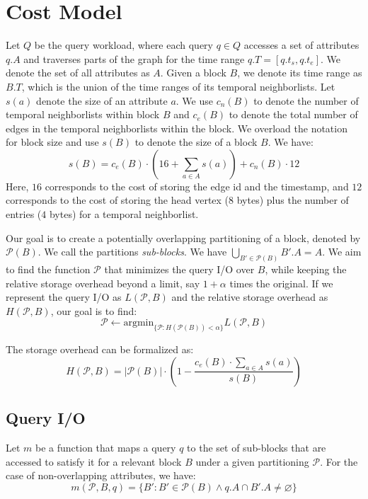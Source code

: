 \documentclass[twocolumn]{svjour3}          %
\let\emptyset\varnothing
\begin{document}
\section{Cost Model}
Let $Q$ be the query workload, where each query $q\in Q$ accesses a set of
attributes $q.A$ and traverses parts of the graph for the time range
$q.T=[q.t_s,q.t_e]$. We denote the set of all attributes as $A$. Given a block
$B$, we denote its time range as $B.T$, which is the union of the time ranges
of its temporal neighborlists. Let $s(a)$ denote the size of an attribute $a$.
We use $c_n(B)$ to denote the number of temporal neighborlists within block
$B$ and $c_e(B)$ to denote the total number of edges in the temporal
neighborlists within the block. We overload the notation for block size and
use $s(B)$ to denote the size of a block $B$. We have: 
\begin{equation}
s(B) = c_e(B) \cdot \left(16 + \sum_{a\in A} s(a)\right) + c_n(B) \cdot 12  
\end{equation}
Here, $16$ corresponds to the cost of storing the edge id and the timestamp,
and $12$ corresponds to the cost of storing the head vertex ($8$ bytes) plus
the number of entries ($4$ bytes) for a temporal neighborlist. 

Our goal is to create a potentially overlapping partitioning of a block,
denoted by $\mathcal{P}(B)$. We call the partitions \emph{sub-blocks}. We have
$\bigcup_{B'\in \mathcal{P}(B)} B'.A = A$. We aim to find the function
$\mathcal{P}$ that minimizes the query I/O over $B$, while keeping the
relative storage overhead beyond a limit, say $1+\alpha$ times the original.
If we represent the query I/O as $L(\mathcal{P}, B)$ and the relative storage
overhead as $H(\mathcal{P}, B)$, our goal is to find:
\begin{equation}
\mathcal{P} \leftarrow \mbox{argmin}_{\{\mathcal{P}: H(\mathcal{P}(B)) < \alpha\}} L(\mathcal{P},B)
\end{equation}

The storage overhead can be formalized as:
\begin{equation}
H(\mathcal{P}, B) = |\mathcal{P}(B)|\cdot\left(1-\frac{c_e(B)\cdot \sum_{a\in A} s(a)}{s(B)}\right) 
\end{equation}

\subsection{Query I/O}

Let $m$ be a function that maps a query $q$ to the set of sub-blocks that are
accessed to satisfy it for a relevant block $B$ under a given partitioning
$\mathcal{P}$. For the case of non-overlapping attributes, we have:
\begin{equation}
m(\mathcal{P}, B, q) = \{B': B'\in \mathcal{P}(B) \wedge q.A \cap B'.A \ne \emptyset\}  
\end{equation}
\end{document}
